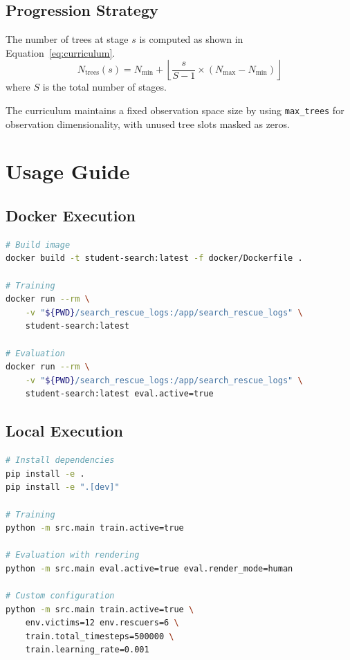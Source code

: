 \documentclass[11pt,a4paper]{article}
\begin{document}
\subsection{Progression Strategy}
\label{subsec:progression}

The number of trees at stage $s$ is computed as shown in Equation~\ref{eq:curriculum}.
\begin{equation}
\label{eq:curriculum}
N_{\text{trees}}(s) = N_{\min} + \left\lfloor \frac{s}{S-1} \times (N_{\max} - N_{\min}) \right\rfloor
\end{equation}
where $S$ is the total number of stages.

The curriculum maintains a fixed observation space size by using \texttt{max\_trees} for observation dimensionality, with unused tree slots masked as zeros.

\section{Usage Guide}
\label{sec:usage}

\subsection{Docker Execution}
\label{subsec:docker}

\begin{lstlisting}[language=bash,caption={Docker execution commands.},label={lst:docker}]
# Build image
docker build -t student-search:latest -f docker/Dockerfile .

# Training
docker run --rm \
    -v "${PWD}/search_rescue_logs:/app/search_rescue_logs" \
    student-search:latest

# Evaluation
docker run --rm \
    -v "${PWD}/search_rescue_logs:/app/search_rescue_logs" \
    student-search:latest eval.active=true
\end{lstlisting}

\subsection{Local Execution}
\label{subsec:local}

\begin{lstlisting}[language=bash,caption={Local execution commands.},label={lst:local}]
# Install dependencies
pip install -e .
pip install -e ".[dev]"

# Training
python -m src.main train.active=true

# Evaluation with rendering
python -m src.main eval.active=true eval.render_mode=human

# Custom configuration
python -m src.main train.active=true \
    env.victims=12 env.rescuers=6 \
    train.total_timesteps=500000 \
    train.learning_rate=0.001
\end{lstlisting}
\end{document}

